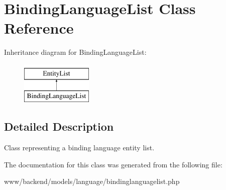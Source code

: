 \hypertarget{classBindingLanguageList}{
\section{BindingLanguageList Class Reference}
\label{classBindingLanguageList}
}
Inheritance diagram for BindingLanguageList:\begin{figure}[H]
\begin{center}
\leavevmode
\includegraphics[height=2.000000cm]{classBindingLanguageList}
\end{center}
\end{figure}


\subsection{Detailed Description}
Class representing a binding language entity list. 

The documentation for this class was generated from the following file:\begin{DoxyCompactItemize}
\item 
www/backend/models/language/bindinglanguagelist.php\end{DoxyCompactItemize}

